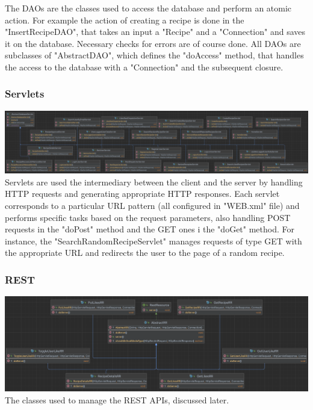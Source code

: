 The DAOs are the classes used to access the database and perform an atomic action. For example the action of creating a recipe is done in the "InsertRecipeDAO", that takes an input a "Recipe" and a "Connection" and saves it on the database. Necessary checks for errors are of course done. All DAOs are subclasses of "AbstractDAO", which defines the "doAccess" method, that handles the access to the database with a "Connection" and the subsequent closure.

\subsubsection{Servlets}

\includegraphics[width=\textwidth]{images/servlets.png}
Servlets are used the intermediary between the client and the server by handling HTTP requests and generating appropriate HTTP responses. Each servlet corresponds to a particular URL pattern (all configured in "WEB.xml" file) and performs specific tasks based on the request parameters, also handling POST requests in the "doPost" method and the GET ones i the "doGet" method. For instance, the "SearchRandomRecipeServlet" manages requests of type GET with the appropriate URL and redirects the user to the page of a random recipe.






\subsubsection{REST}

\includegraphics[width=\textwidth]{images/rest.png}
The classes used to manage the REST APIs, discussed later.



